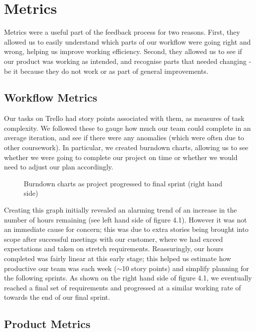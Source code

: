 \section{Metrics}
Metrics were a useful part of the feedback process for two reasons. First, they allowed us to easily understand which parts of our workflow were going right and wrong, helping us improve working efficiency. Second, they allowed us to see if our product was working as intended, and recognise parts that needed changing - be it because they do not work or as part of general improvements.

\subsection{Workflow Metrics}
Our tasks on Trello had story points associated with them, as measures of task complexity. We followed these to gauge how much our team could complete in an average iteration, and see if there were any anomalies (which were often due to other coursework). In particular, we created burndown charts, allowing us to see whether we were going to complete our project on time or whether we would need to adjust our plan accordingly. 

\begin{figure}[h]
\caption{Burndown charts as project progressed to final sprint (right hand side)}
\end{figure}

Creating this graph initially revealed an alarming trend of an increase in the number of hours remaining (see left hand side of figure 4.1). However it was not an immediate cause for concern; this was due to extra stories being brought into scope after successful meetings with our customer, where we had exceed expectations and taken on stretch requirements. Reassuringly, our hours completed was fairly linear at this early stage; this helped us estimate how productive our team was each week ($\sim$10 story points) and simplify planning for the following sprints. As shown on the right hand side of figure 4.1, we eventually reached a final set of requirements and progressed at a similar working rate of towards the end of our final sprint. 

\subsection{Product Metrics}

